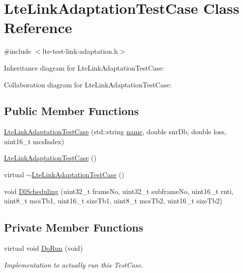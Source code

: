 \hypertarget{classLteLinkAdaptationTestCase}{}\section{Lte\+Link\+Adaptation\+Test\+Case Class Reference}
\label{classLteLinkAdaptationTestCase}


{\ttfamily \#include $<$lte-\/test-\/link-\/adaptation.\+h$>$}



Inheritance diagram for Lte\+Link\+Adaptation\+Test\+Case\+:


Collaboration diagram for Lte\+Link\+Adaptation\+Test\+Case\+:
\subsection*{Public Member Functions}
\begin{DoxyCompactItemize}
\item 
\hyperlink{classLteLinkAdaptationTestCase_abbf9a5152596223e3e67bfe00dc684f9}{Lte\+Link\+Adaptation\+Test\+Case} (std\+::string \hyperlink{generate__test__data__lte__spectrum__model_8m_ab74e6bf80237ddc4109968cedc58c151}{name}, double snr\+Db, double loss, uint16\+\_\+t mcs\+Index)
\item 
\hyperlink{classLteLinkAdaptationTestCase_a08b8771d39edbcff479b3ea3f6206df0}{Lte\+Link\+Adaptation\+Test\+Case} ()
\item 
virtual \hyperlink{classLteLinkAdaptationTestCase_a011cb8c197c4c80154ac196be75f34ff}{$\sim$\+Lte\+Link\+Adaptation\+Test\+Case} ()
\item 
void \hyperlink{classLteLinkAdaptationTestCase_abe76dc7e993ce14da01c6d714be7d0f3}{Dl\+Scheduling} (uint32\+\_\+t frame\+No, uint32\+\_\+t subframe\+No, uint16\+\_\+t rnti, uint8\+\_\+t mcs\+Tb1, uint16\+\_\+t size\+Tb1, uint8\+\_\+t mcs\+Tb2, uint16\+\_\+t size\+Tb2)
\end{DoxyCompactItemize}
\subsection*{Private Member Functions}
\begin{DoxyCompactItemize}
\item 
virtual void \hyperlink{classLteLinkAdaptationTestCase_a2310163be7e860827f18fce7fd100649}{Do\+Run} (void)
\begin{DoxyCompactList}\small\item\em Implementation to actually run this Test\+Case. \end{DoxyCompactList}\end{DoxyCompactItemize}
